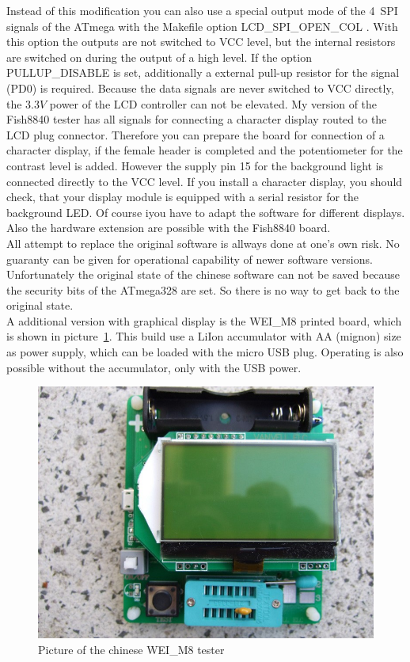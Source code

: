 Instead of this modification you can also use a special output mode of the 4~SPI signals of the ATmega
with the Makefile option LCD\_SPI\_OPEN\_COL .
With this option the outputs are not switched to VCC level,
but the internal  resistors are switched on during the output of a high level.
If the option PULLUP\_DISABLE is set, additionally a external pull-up resistor for
the  signal (PD0) is required.
Because the data signals are never switched to VCC directly, the \(3.3V\) power of the LCD controller
can not be elevated.
My version of the Fish8840 tester has all signals for connecting a character display
routed to the LCD plug connector.
Therefore you can prepare the board for connection of a character display, if the
female header is completed and the potentiometer for the contrast level is added.
However the supply pin 15 for the background light is connected directly to the VCC level.
If you install a character display, you should check, that your display module
is equipped with a serial resistor for the background LED.
Of course iyou have to adapt the software for different displays. 
Also the hardware extension are possible with the Fish8840 board.\\

All attempt to replace the original software is allways done at one's own risk.
No guaranty can be given for operational capability of newer software versions.
Unfortunately the original state of the chinese software can not be saved because the 
security bits of the ATmega328 are set. So there is no way to get back to the original state.\\


A additional version with graphical display is the WEI\_M8 printed board, which is shown in picture~\ref{fig:WeiM8}.
This build use a LiIon accumulator with AA (mignon) size as power supply, which can be loaded
with the micro USB plug. Operating is also possible without the accumulator, only with the USB power.

\begin{figure}[H]
\centering
\includegraphics[width=.698\textwidth]{../PNG/WEI_M8.JPG}
\caption{Picture of the chinese WEI\_M8 tester}
\label{fig:WeiM8}
\end{figure}

